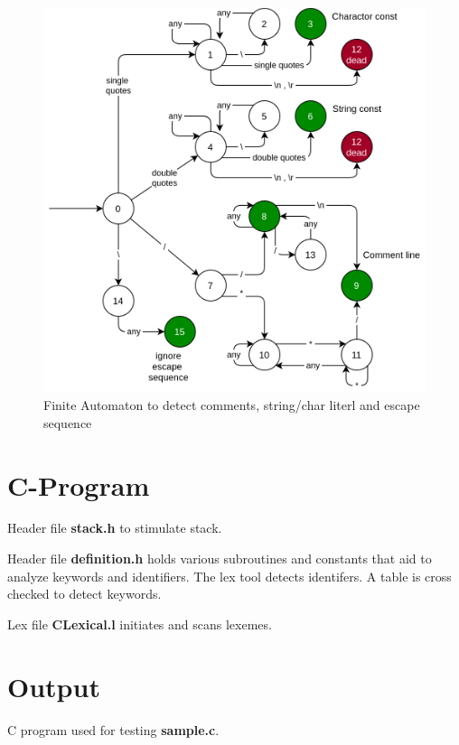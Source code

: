 \begin{figure}[H]
	\centering
	\includegraphics[width=\textwidth]{../EXP1/char-stream.png}
	\caption{Finite Automaton to detect comments, string/char literl and escape sequence}
\end{figure}


\section{C-Program}
Header file \textbf{stack.h} to stimulate stack.


\vspace{0.5cm}
Header file \textbf{definition.h} holds various subroutines and constants that aid to analyze keywords and identifiers. The lex tool detects identifers. A table is cross checked to detect keywords.


\vspace{0.5cm}
Lex file \textbf{CLexical.l} initiates and scans lexemes.




\section{Output}
C program used for testing \textbf{sample.c}.



